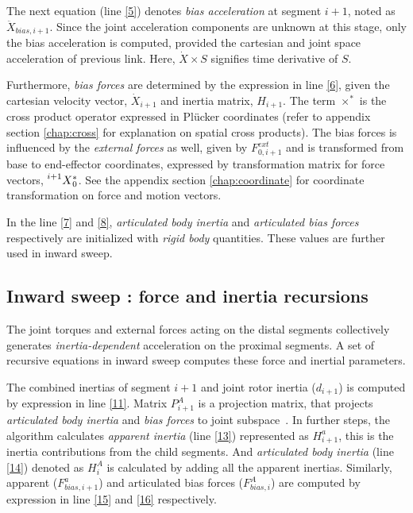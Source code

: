 The next equation (line \ref{5}) denotes \textit{bias acceleration} at segment $i+1$, noted as $\ddot{X}_{bias, i+1}$. Since the joint acceleration components are unknown at this stage, only the bias acceleration is computed, provided the cartesian and joint space acceleration of previous link. Here, $\dot{X} \times S$ signifies time derivative of $S$. 

Furthermore, \textit{bias forces} are determined by the expression in line \ref{6}, given the cartesian velocity vector, $\dot{X}_{i+1}$ and inertia matrix, $H_{i+1}$. The term $\times^*$ is the cross product operator expressed in Pl{\"u}cker coordinates (refer to appendix section \ref{chap:cross} for explanation on spatial cross products). The bias forces is influenced by the \textit{external forces} as well, given by $F^{ext}_{0, i+1}$ and is transformed from base to end-effector coordinates, expressed by transformation matrix for force vectors, $\prescript{i+1}{}{X}_0^*$. See the appendix section \ref{chap:coordinate} for coordinate transformation on force and motion vectors.

In the line \ref{7} and \ref{8}, \textit{articulated body inertia} and \textit{articulated bias forces} respectively are initialized with \textit{rigid body} quantities. These values are further used in inward sweep.

\subsection{Inward sweep : force and inertia recursions}

The joint torques and external forces acting on the distal segments collectively generates \textit{inertia-dependent} acceleration on the proximal segments. A set of recursive equations in inward sweep computes these force and inertial parameters. 

The combined inertias of segment $i+1$ and joint rotor inertia ($d_{i+1}$) is computed by expression in line \ref{11}. Matrix $P^A_{i+1}$ is a projection matrix, that projects \textit{articulated body inertia} and \textit{bias forces} to joint subspace~\cite{shakhimardanov2015composable}. In further steps, the algorithm calculates \textit{apparent inertia} (line \ref{13}) represented as $H^a_{i+1}$, this is the inertia contributions from the child segments. And \textit{articulated body inertia} (line \ref{14}) denoted as $H^A_{i}$ is calculated by adding all the apparent inertias. Similarly, apparent ($F^a_{bias, i+1}$) and articulated bias forces ($F^A_{bias, i}$) are computed by expression in line \ref{15} and \ref{16} respectively.


